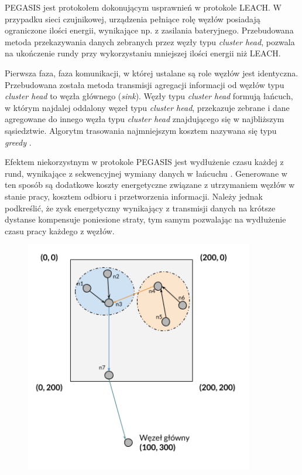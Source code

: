 \documentclass[a4paper,12pt,twoside,openany]{report}
\begin{document}
PEGASIS jest protokołem dokonującym usprawnień w protokole LEACH. W przypadku sieci czujnikowej, urządzenia pełniące rolę węzłów posiadają ograniczone ilości energii, wynikające np. z zasilania bateryjnego.
Przebudowana metoda przekazywania danych zebranych przez węzły typu \textit{cluster head}, pozwala na ukończenie rundy przy wykorzystaniu mniejszej ilości energii niż LEACH.

Pierwsza faza, faza komunikacji, w której ustalane są role węzłów jest identyczna. Przebudowana została metoda transmisji agregacji informacji od węzłów typu \textit{cluster head} to węzła głównego (\textit{sink}).
Węzły typu \textit{cluster head} formują łańcuch, w którym najdalej oddalony węzeł typu \textit{cluster head}, przekazuje zebrane i dane agregowane do innego węzła typu \textit{cluster head} znajdującego się w najbliższym 
sąsiedztwie. Algorytm trasowania najmniejszym kosztem nazywana się typu \textit{greedy} \cite{algoBook}.

Efektem niekorzystnym w protokole PEGASIS jest wydłużenie czasu każdej z rund, wynikające z sekwencyjnej wymiany danych w łańcuchu \cite{Lindsey-Pegasis}.
Generowane w ten sposób są dodatkowe koszty energetyczne związane z utrzymaniem węzłów w stanie pracy, kosztem odbioru i przetworzenia informacji.
Należy jednak podkreślić, że zysk energetyczny wynikający z transmisji danych na krótsze dystanse kompensuje poniesione straty, tym samym pozwalając na wydłużenie czasu pracy każdego z węzłów.

\begin{figure}[H]
 \centering
 \includegraphics[width=10cm]{images/komunikacja_pegasis.png} 
\end{figure}
\end{document}
